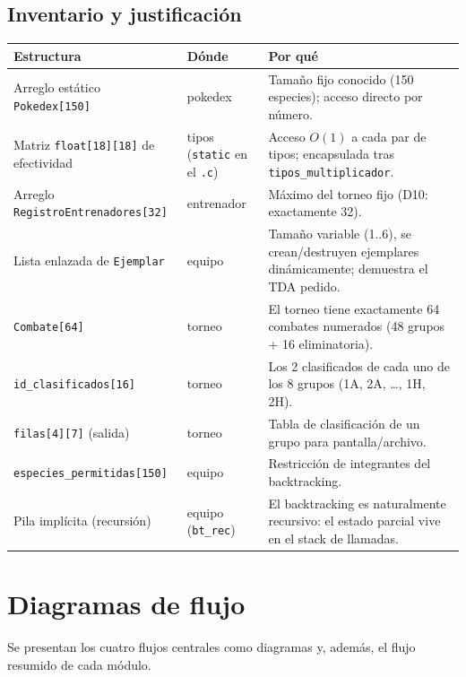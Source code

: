 \documentclass[11pt,a4paper]{article}
\begin{document}
\subsection{Inventario y justificaci\'on}

\begin{longtable}{p{5.4cm} p{3.2cm} p{6.6cm}}
\toprule
\textbf{Estructura} & \textbf{D\'onde} & \textbf{Por qu\'e} \\
\midrule
Arreglo est\'atico \texttt{Pokedex[150]} & pokedex & Tama\~no fijo conocido (150 especies); acceso directo por n\'umero. \\
Matriz \texttt{float[18][18]} de efectividad & tipos (\texttt{static} en el \texttt{.c}) & Acceso $O(1)$ a cada par de tipos; encapsulada tras \texttt{tipos\_multiplicador}. \\
Arreglo \texttt{RegistroEntrenadores[32]} & entrenador & M\'aximo del torneo fijo (D10: exactamente 32). \\
Lista enlazada de \texttt{Ejemplar} & equipo & Tama\~no variable (1..6), se crean/destruyen ejemplares din\'amicamente; demuestra el TDA pedido. \\
\texttt{Combate[64]} & torneo & El torneo tiene exactamente 64 combates numerados (48 grupos + 16 eliminatoria). \\
\texttt{id\_clasificados[16]} & torneo & Los 2 clasificados de cada uno de los 8 grupos (1A, 2A, \dots, 1H, 2H). \\
\texttt{filas[4][7]} (salida) & torneo & Tabla de clasificaci\'on de un grupo para pantalla/archivo. \\
\texttt{especies\_permitidas[150]} & equipo & Restricci\'on de integrantes del backtracking. \\
Pila impl\'icita (recursi\'on) & equipo (\texttt{bt\_rec}) & El backtracking es naturalmente recursivo: el estado parcial vive en el stack de llamadas. \\
\bottomrule
\end{longtable}

\section{Diagramas de flujo}
Se presentan los cuatro flujos centrales como diagramas y, adem\'as, el flujo
resumido de cada m\'odulo.
\end{document}
